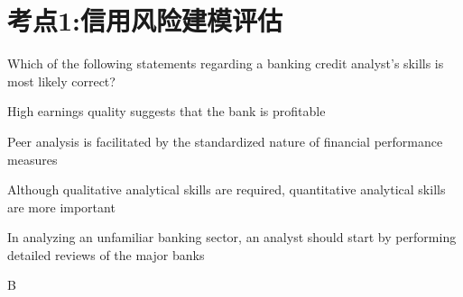 \documentclass{article}
\newcounter{question} %
\begin{document}
 \tableofcontents %
\newpage




\section{考点1:信用风险建模评估}
\setcounter{question}{0}

\begin{question}
    Which of the following statements regarding a banking credit analyst's skills is most likely correct?
\end{question}

\begin{choices}
    \item High earnings quality suggests that the bank is profitable
    \item Peer analysis is facilitated by the standardized nature of financial performance measures
    \item Although qualitative analytical skills are required, quantitative analytical skills are more important
    \item In analyzing an unfamiliar banking sector, an analyst should start by performing detailed reviews of the major banks
\end{choices}

\begin{correctanswer}
    B
\end{correctanswer}
\end{document}
